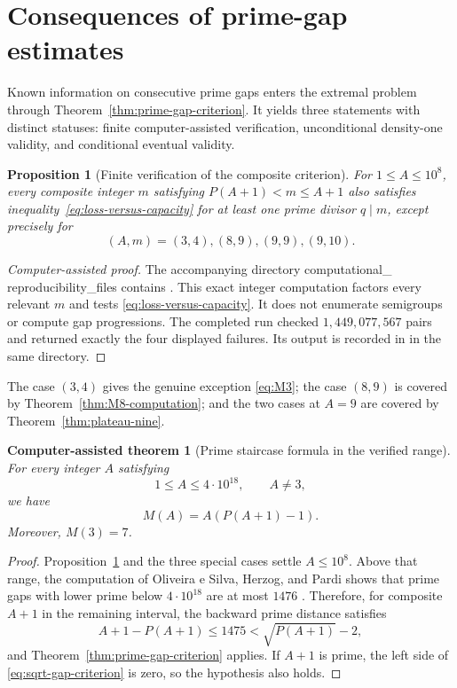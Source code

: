 \documentclass[11pt]{article}
\theoremstyle{plain}
\newtheorem{proposition}[theorem]{Proposition}
\newtheorem{computertheorem}[theorem]{Computer-assisted theorem}
\theoremstyle{definition}
\theoremstyle{remark}
\newcommand{\compdir}{{\small\ttfamily computational\_\allowbreak
  reproducibility\_\allowbreak files}}
\begin{document}
\section{Consequences of prime-gap estimates}\label{sec:prime-gaps}

Known information on consecutive prime gaps enters the extremal problem
through Theorem~\ref{thm:prime-gap-criterion}.  It yields three statements
with distinct statuses: finite computer-assisted verification, unconditional
density-one validity, and conditional eventual validity.

\begin{proposition}[Finite verification of the composite criterion]
\label{prop:criterion-computation}
For $1\leq A\leq10^8$, every composite integer $m$ satisfying
$P(A+1)<m\leq A+1$ also satisfies inequality~\eqref{eq:loss-versus-capacity}
for at least one prime divisor $q\mid m$, except precisely for
\[
  (A,m)=(3,4),(8,9),(9,9),(9,10).
\]
\end{proposition}

\begin{proof}[Computer-assisted proof]
The accompanying directory \compdir{}
contains .  This exact integer computation factors
every relevant $m$ and tests \eqref{eq:loss-versus-capacity}.  It does not enumerate
semigroups or compute gap progressions.  The completed run checked
$1{,}449{,}077{,}567$ pairs and returned exactly the four displayed failures.
Its output is recorded in  in the same
directory.
\end{proof}

The case $(3,4)$ gives the genuine exception \eqref{eq:M3}; the case
$(8,9)$ is covered by Theorem~\ref{thm:M8-computation}; and the two cases at
$A=9$ are covered by Theorem~\ref{thm:plateau-nine}.

\begin{computertheorem}[Prime staircase formula in the verified range]
\label{thm:verified-range}
For every integer $A$ satisfying
\[
  1\leq A\leq4\cdot10^{18},
  \qquad A\neq 3,
\]
we have
\[
  \boxed{M(A)=A(P(A+1)-1).}
\]
Moreover, $M(3)=7$.
\end{computertheorem}

\begin{proof}
Proposition~\ref{prop:criterion-computation} and the three special cases
settle $A\leq10^8$.  Above that range, the computation of Oliveira e Silva,
Herzog, and Pardi shows that prime gaps with lower prime below
$4\cdot10^{18}$ are at most $1476$
\cite{oliveira-silva-herzog-pardi,oliveira-gap-table}.  Therefore, for composite
$A+1$ in the remaining interval, the backward prime distance satisfies
\[
  A+1-P(A+1)\leq1475<\sqrt{P(A+1)}-2,
\]
and Theorem~\ref{thm:prime-gap-criterion} applies.  If $A+1$ is prime, the
left side of \eqref{eq:sqrt-gap-criterion} is zero, so the hypothesis also
holds.
\end{proof}
\end{document}
